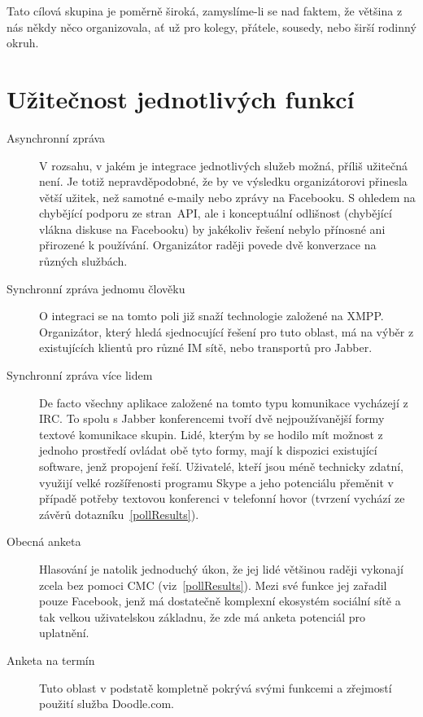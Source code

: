 \documentclass[12pt,oneside,final]{fithesis2}
\begin{document}
Tato cílová skupina je poměrně široká, zamyslíme-li se nad faktem, že většina z nás někdy něco organizovala, ať už pro kolegy, přátele, sousedy, nebo širší rodinný okruh.


\section{Užitečnost jednotlivých funkcí}\label{utility}
\begin{description}
    \item[Asynchronní zpráva]
        V rozsahu, v jakém je integrace jednotlivých služeb možná, příliš užitečná není. Je totiž nepravděpodobné, že by ve výsledku organizátorovi přinesla větší užitek, než samotné e-maily nebo zprávy na Facebooku. S ohledem na chybějící podporu ze stran~API, ale i konceptuální odlišnost (chybějící vlákna diskuse na Facebooku) by jakékoliv řešení nebylo přínosné ani přirozené k používání. Organizátor raději povede dvě konverzace na různých službách.

    \item[Synchronní zpráva jednomu člověku]
        O integraci se na tomto poli již snaží technologie založené na XMPP. Organizátor, který hledá sjednocující řešení pro tuto oblast, má na výběr z existujících klientů pro různé IM sítě, nebo transportů pro Jabber.

    \item[Synchronní zpráva více lidem]
        De facto všechny aplikace založené na tomto typu komunikace vycházejí z IRC. To spolu s Jabber konferencemi tvoří dvě nejpoužívanější formy textové komunikace skupin. Lidé, kterým by se hodilo mít možnost z jednoho prostředí ovládat obě tyto formy, mají k dispozici existující software, jenž propojení řeší. Uživatelé, kteří jsou méně technicky zdatní, využijí velké rozšířenosti programu Skype a jeho potenciálu přeměnit v případě potřeby textovou konferenci v telefonní hovor (tvrzení vychází ze závěrů dotazníku~\ref{pollResults}).

    \item[Obecná anketa]
        Hlasování je natolik jednoduchý úkon, že jej lidé většinou raději vykonají zcela bez pomoci CMC (viz~\ref{pollResults}). Mezi své funkce jej zařadil pouze Facebook, jenž má dostatečně komplexní ekosystém sociální sítě a tak velkou uživatelskou základnu, že zde má anketa potenciál pro uplatnění.

    \item[Anketa na termín]
        Tuto oblast v podstatě kompletně pokrývá svými funkcemi a zřejmostí použití služba Doodle.com.


\end{description}
\end{document}
